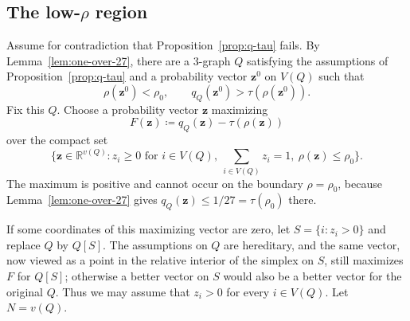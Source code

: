 \documentclass[10pt]{article}
\numberwithin{equation}{section}
\theoremstyle{definition}
\theoremstyle{remark}
\begin{document}
\subsection[The low-rho region]{The low-$\rho$ region}

Assume for contradiction that Proposition~\ref{prop:q-tau} fails. By Lemma~\ref{lem:one-over-27}, there are a $3$-graph $Q$ satisfying the assumptions of Proposition~\ref{prop:q-tau} and a probability vector $\mathbf{z}^0$ on $V(Q)$ such that
\[
        \rho(\mathbf{z}^0)<\rho_0,
        \qquad
        q_Q(\mathbf{z}^0)>\tau(\rho(\mathbf{z}^0)).
\]
Fix this $Q$. Choose a probability vector $\mathbf{z}$ maximizing
\[
        F(\mathbf{z})
        \coloneqq q_Q(\mathbf{z})-\tau(\rho(\mathbf{z}))
\]
over the compact set
\[
       \Big\{ \mathbf{z} \in \mathbb{R}^{v(Q)} \colon z_i\ge0 \text{ for } i \in V(Q),\ \sum_{i\in V(Q)}z_i=1,\ \rho(\mathbf{z})\le\rho_0 \Big\}.
\]
The maximum is positive and cannot occur on the boundary $\rho=\rho_0$, because Lemma~\ref{lem:one-over-27} gives $q_Q(\mathbf{z})\le1/27=\tau(\rho_0)$ there.

If some coordinates of this maximizing vector are zero, let $S=\{i:z_i>0\}$ and replace $Q$ by $Q[S]$. The assumptions on $Q$ are hereditary, and the same vector, now viewed as a point in the relative interior of the simplex on $S$, still maximizes $F$ for $Q[S]$; otherwise a better vector on $S$ would also be a better vector for the original $Q$. Thus we may assume that $z_i>0$ for every $i\in V(Q)$. Let $N=v(Q)$.
\end{document}
